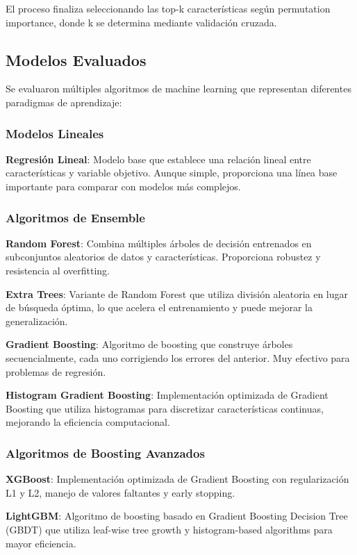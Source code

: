 \documentclass[conference]{IEEEtran}
\begin{document}
	El proceso finaliza seleccionando las top-k características según permutation importance, donde k se determina mediante validación cruzada.
	
	\subsection{Modelos Evaluados}
	Se evaluaron múltiples algoritmos de machine learning que representan diferentes paradigmas de aprendizaje:
	
	\subsubsection{Modelos Lineales}
	\textbf{Regresión Lineal}: Modelo base que establece una relación lineal entre características y variable objetivo. Aunque simple, proporciona una línea base importante para comparar con modelos más complejos.
	
	\subsubsection{Algoritmos de Ensemble}
	\textbf{Random Forest}: Combina múltiples árboles de decisión entrenados en subconjuntos aleatorios de datos y características. Proporciona robustez y resistencia al overfitting.
	
	\textbf{Extra Trees}: Variante de Random Forest que utiliza división aleatoria en lugar de búsqueda óptima, lo que acelera el entrenamiento y puede mejorar la generalización.
	
	\textbf{Gradient Boosting}: Algoritmo de boosting que construye árboles secuencialmente, cada uno corrigiendo los errores del anterior. Muy efectivo para problemas de regresión.
	
	\textbf{Histogram Gradient Boosting}: Implementación optimizada de Gradient Boosting que utiliza histogramas para discretizar características continuas, mejorando la eficiencia computacional.
	
	\subsubsection{Algoritmos de Boosting Avanzados}
	\textbf{XGBoost}: Implementación optimizada de Gradient Boosting con regularización L1 y L2, manejo de valores faltantes y early stopping.
	
	\textbf{LightGBM}: Algoritmo de boosting basado en Gradient Boosting Decision Tree (GBDT) que utiliza leaf-wise tree growth y histogram-based algorithms para mayor eficiencia.
	
\end{document}
